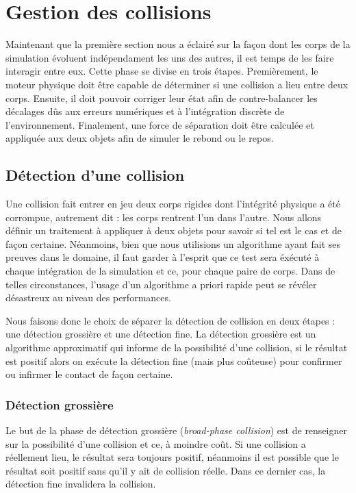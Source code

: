 \section{Gestion des collisions}

Maintenant que la première section nous a éclairé sur la façon dont
les corps de la simulation évoluent indépendament les uns des autres,
il est temps de les faire interagir entre eux. Cette phase se divise
en trois étapes. Premièrement, le moteur physique doit être capable de
déterminer si une collision a lieu entre deux corps. Ensuite, il doit
pouvoir corriger leur état afin de contre-balancer les décalages dûs
aux erreurs numériques et à l'intégration discrète de
l'environnement. Finalement, une force de séparation doit être
calculée et appliquée aux deux objets afin de simuler le rebond ou le
repos.

\subsection{Détection d'une collision}

Une collision fait entrer en jeu deux corps rigides dont l'intégrité
physique a été corrompue, autrement dit : les corps rentrent l'un dans
l'autre. Nous allons définir un traitement à appliquer à deux objets
pour savoir si tel est le cas et de façon certaine. Néanmoins, bien
que nous utilisions un algorithme ayant fait ses preuves dans le
domaine, il faut garder à l'esprit que ce test sera éxécuté à chaque
intégration de la simulation et ce, pour chaque paire de corps. Dans
de telles circonstances, l'usage d'un algorithme a priori rapide peut
se révéler désastreux au niveau des performances.

Nous faisons donc le choix de séparer la détection de collision en
deux étapes : une détection grossière et une détection fine. La
détection grossière est un algorithme approximatif qui informe de la
possibilité d'une collision, si le résultat est positif alors on
exécute la détection fine (mais plus coûteuse) pour confirmer ou
infirmer le contact de façon certaine.

\subsubsection{Détection grossière}

Le but de la phase de détection grossière (\textit{broad-phase
  collision}) est de renseigner sur la possibilité d'une collision et
ce, à moindre coût. Si une collision a réellement lieu, le résultat
sera toujours positif, néanmoins il est possible que le résultat soit
positif sans qu'il y ait de collision réelle. Dans ce dernier cas, la
détection fine invalidera la collision.

